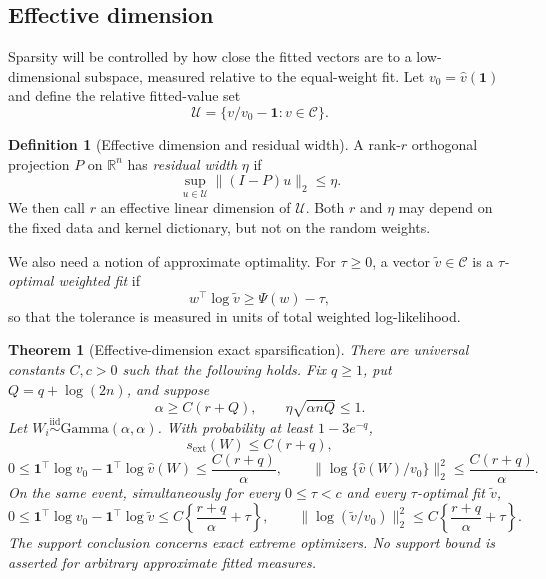\documentclass[11pt]{article}
\newtheorem{theorem}{Theorem}
\theoremstyle{definition}
\newtheorem{definition}{Definition}
\theoremstyle{remark}
\newcommand{\Ccal}{\mathcal C}
\newcommand{\Ucal}{\mathcal U}
\newcommand{\RR}{\mathbb R}
\newcommand{\one}{\bm 1}
\newcommand{\norm}[1]{\lVert #1\rVert}
\newcommand{\vhat}{\widehat v}
\newcommand{\vtil}{\widetilde v}
\newcommand{\sext}{s_{\mathrm{ext}}}
\begin{document}
\subsection{Effective dimension}

Sparsity will be controlled by how close the fitted vectors are to a
low-dimensional subspace, measured relative to the equal-weight fit.  Let
$v_0=\vhat(\one)$ and define the relative fitted-value set
\begin{equation}\label{eq:relative-set}
 \Ucal=\{v/v_0-\one:v\in\Ccal\}.
\end{equation}

\begin{definition}[Effective dimension and residual width]
A rank-$r$ orthogonal projection $P$ on $\RR^n$ has \emph{residual width}
$\eta$ if
\begin{equation}\label{eq:width}
 \sup_{u\in\Ucal}\norm{(I-P)u}_2\le\eta.
\end{equation}
We then call $r$ an effective linear dimension of $\Ucal$.  Both $r$ and
$\eta$ may depend on the fixed data and kernel dictionary, but not on the
random weights.
\end{definition}

We also need a notion of approximate optimality.  For $\tau\ge0$, a vector
$\vtil\in\Ccal$ is a \emph{$\tau$-optimal weighted fit} if
\begin{equation}\label{eq:tau-opt}
 w^\top\log\vtil\ge\Psi(w)-\tau,
\end{equation}
so that the tolerance is measured in units of total weighted log-likelihood.

\begin{theorem}[Effective-dimension exact sparsification]
\label{thm:effective}
There are universal constants $C,c>0$ such that the following holds.  Fix
$q\ge1$, put $Q=q+\log(2n)$, and suppose
\begin{equation}\label{eq:effective-conditions}
 \alpha\ge C(r+Q),
 \qquad
 \eta\sqrt{\alpha nQ}\le1.
\end{equation}
Let $W_i\stackrel{\mathrm{iid}}\sim\mathrm{Gamma}(\alpha,\alpha)$.  With
probability at least $1-3e^{-q}$,
\begin{equation}\label{eq:effective-support}
 \sext(W)\le C(r+q),
\end{equation}
\begin{equation}\label{eq:effective-exact-fit}
 0\le \one^\top\log v_0-\one^\top\log\vhat(W)
 \le\frac{C(r+q)}{\alpha},
 \qquad
 \norm{\log\{\vhat(W)/v_0\}}_2^2
 \le\frac{C(r+q)}{\alpha}.
\end{equation}
On the same event, simultaneously for every $0\le\tau<c$ and every
$\tau$-optimal fit $\vtil$,
\begin{equation}\label{eq:effective-approx-fit}
 0\le \one^\top\log v_0-\one^\top\log\vtil
 \le C\left\{\frac{r+q}{\alpha}+\tau\right\},
 \qquad
 \norm{\log(\vtil/v_0)}_2^2
 \le C\left\{\frac{r+q}{\alpha}+\tau\right\}.
\end{equation}
The support conclusion concerns exact extreme optimizers.  No support bound
is asserted for arbitrary approximate fitted measures.
\end{theorem}
\end{document}
